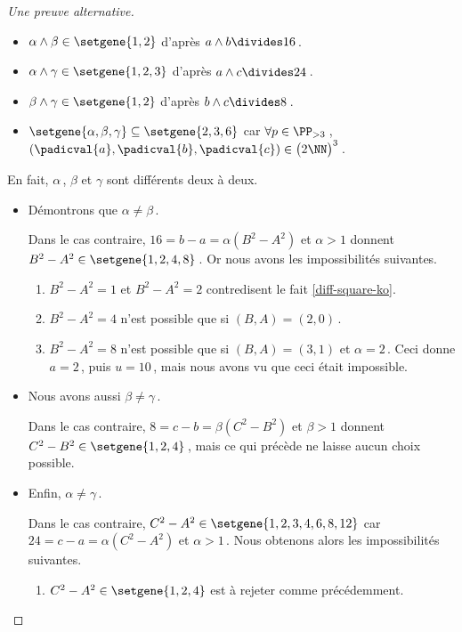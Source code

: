 \begin{proof}[Une preuve alternative]
    \begin{itemize}
		\item $\alpha \wedge \beta \in \setgene{1, 2}$
		d'après $a \wedge b \divides 16$\,.

		\item $\alpha \wedge \gamma \in \setgene{1, 2, 3}$
		d'après $a \wedge c \divides 24$\,.

		\item $\beta \wedge \gamma \in \setgene{1, 2}$
		d'après $b \wedge c \divides 8$\,.

		\item $\setgene{\alpha, \beta, \gamma} \subseteq \setgene{2, 3, 6}$
		car $\forall p \in \PP_{>3}$\,, $(\padicval{a}, \padicval{b}, \padicval{c}) \in \big( 2 \NN \big)^3$\,. 
    \end{itemize}
		


	En fait, $\alpha$\,, $\beta$ et $\gamma$ sont différents deux à deux.
	
    \begin{itemize}	
		\item Démontrons que $\alpha \neq \beta$\,. 
		
		\noindent
		Dans le cas contraire, $16 = b - a = \alpha(B^2 - A^2)$ et $\alpha > 1$ donnent $B^2 - A^2 \in \setgene{1, 2, 4, 8}$\,.
		Or nous avons les impossibilités suivantes.
		\begin{enumerate}
			\item $B^2 - A^2 = 1$  et $B^2 - A^2 = 2$ contredisent le fait \ref{diff-square-ko}.
			\item $B^2 - A^2 = 4$ n'est possible que si $(B, A) = (2, 0)$\,.
			\item $B^2 - A^2 = 8$ n'est possible que si $(B, A) = (3, 1)$ et $\alpha = 2$\,.
			Ceci donne $a = 2$\,, puis $u = 10$\,, mais nous avons vu que ceci était impossible.
		\end{enumerate}
		

		\item Nous avons aussi $\beta \neq \gamma$\,. 
		
		\noindent
		Dans le cas contraire, $8 = c - b = \beta(C^2 - B^2)$ et $\beta > 1$ donnent $C^2 - B^2 \in \setgene{1, 2, 4}$\,, mais ce qui précède ne laisse aucun choix possible.
		

		\item Enfin, $\alpha \neq \gamma$\,. 
		
		\noindent
		Dans le cas contraire,
		$C^2 - A^2 \in \setgene{1, 2, 3, 4, 6, 8, 12}$
		car 
		$24 = c - a = \alpha(C^2 - A^2)$ et $\alpha > 1$\,.
		Nous obtenons alors les impossibilités suivantes.
		\begin{enumerate}
			\item $C^2 - A^2 \in \setgene{1, 2, 4}$ est à rejeter comme précédemment.
			

\end{enumerate}
\end{itemize}
\end{proof}
